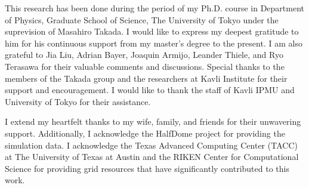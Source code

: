 
This research has been done during the period of my Ph.D. course in Department of Physics, Graduate School of Science, The University of Tokyo under the suprevision of Masahiro Takada. I would like to express my deepest gratitude to him for his continuous support from my master's degree to the present. I am also grateful to Jia Liu, Adrian Bayer, Joaquin Armijo, Leander Thiele, and Ryo Terasawa for their valuable comments and discussions. Special thanks to the members of the Takada group and the researchers at Kavli Institute for their support and encouragement. I would like to thank the staff of Kavli IPMU and University of Tokyo for their assistance.

I extend my heartfelt thanks to my wife, family, and friends for their unwavering support. Additionally, I acknowledge the HalfDome project for providing the simulation data.
I acknowledge the Texas Advanced Computing Center (TACC) at The University of Texas at Austin and the RIKEN Center for Computational Science for providing grid resources that have significantly contributed to this work.

